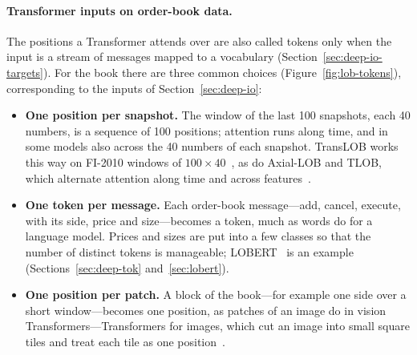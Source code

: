 \paragraph{Transformer inputs on order-book data.} The positions a Transformer attends over are also called
tokens only when the input is a stream of messages mapped to a vocabulary
(Section~\ref{sec:deep-io-targets}). For the book there are three common choices (Figure~\ref{fig:lob-tokens}),
corresponding to the inputs of Section~\ref{sec:deep-io}:
\begin{itemize}[leftmargin=1.5em,itemsep=2pt]
\item \textbf{One position per snapshot.} The window of the last 100 snapshots, each 40 numbers, is a sequence of 100
  positions; attention runs along time, and in some models also across the 40 numbers of each snapshot. TransLOB
  works this way on FI-2010 windows of $100 \times 40$~\citep{wallbridge2020}, as do Axial-LOB and TLOB, which
  alternate attention along time and across features~\citep{kisiel2022axial,berti2025tlob}.
\item \textbf{One token per message.} Each order-book message---add, cancel, execute, with its side, price and
  size---becomes a token, much as words do for a language model. Prices and sizes are put into a few classes so
  that the number of distinct tokens is manageable; LOBERT~\citep{linna2025lobert} is an example
  (Sections~\ref{sec:deep-tok} and~\ref{sec:lobert}).
\item \textbf{One position per patch.} A block of the book---for example one side over a short window---becomes one
  position, as patches of an image do in vision Transformers---Transformers for images, which cut an image into small
  square tiles and treat each tile as one position~\citep{lit2025}.
\end{itemize}

